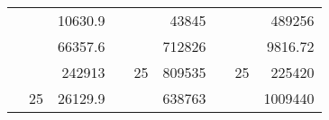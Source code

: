 \begin{table}[H]
\begin{tabular}{|ccrccrccc}
\rowcolor[HTML]{DAE8FC} 
\multicolumn{1}{|c|}{\cellcolor[HTML]{FFFFC7}}                                & \multicolumn{1}{c|}{\cellcolor[HTML]{DAE8FC}}                      & \multicolumn{1}{r|}{\cellcolor[HTML]{DAE8FC}10630.9}   & \multicolumn{1}{c|}{\cellcolor[HTML]{FFFFC7}}                                & \multicolumn{1}{c|}{\cellcolor[HTML]{DAE8FC}}                       & \multicolumn{1}{r|}{\cellcolor[HTML]{DAE8FC}43845}     & \multicolumn{1}{c|}{\cellcolor[HTML]{FFFFC7}}                                & \multicolumn{1}{c|}{\cellcolor[HTML]{DAE8FC}}                      & \multicolumn{1}{r|}{\cellcolor[HTML]{DAE8FC}489256}    \\ \cline{3-3} \cline{6-6} \cline{9-9} 
\multicolumn{1}{|c|}{\cellcolor[HTML]{FFFFC7}}                                & \multicolumn{1}{c|}{\cellcolor[HTML]{DAE8FC}}                      & \multicolumn{1}{r|}{\cellcolor[HTML]{DDFDFF}66357.6}   & \multicolumn{1}{c|}{\cellcolor[HTML]{FFFFC7}}                                & \multicolumn{1}{c|}{\cellcolor[HTML]{DAE8FC}}                       & \multicolumn{1}{r|}{\cellcolor[HTML]{DDFDFF}712826}    & \multicolumn{1}{c|}{\cellcolor[HTML]{FFFFC7}}                                & \multicolumn{1}{c|}{\cellcolor[HTML]{DAE8FC}}                      & \multicolumn{1}{r|}{\cellcolor[HTML]{DDFDFF}9816.72}   \\ \cline{3-3} \cline{6-6} \cline{9-9} 
\rowcolor[HTML]{DAE8FC} 
\multicolumn{1}{|c|}{\cellcolor[HTML]{FFFFC7}}                                & \multicolumn{1}{c|}{\cellcolor[HTML]{DAE8FC}}                      & \multicolumn{1}{r|}{\cellcolor[HTML]{DAE8FC}242913}    & \multicolumn{1}{c|}{\cellcolor[HTML]{FFFFC7}}                                & \multicolumn{1}{c|}{\multirow{-9}{*}{\cellcolor[HTML]{DAE8FC}25}}   & \multicolumn{1}{r|}{\cellcolor[HTML]{DAE8FC}809535}    & \multicolumn{1}{c|}{\cellcolor[HTML]{FFFFC7}}                                & \multicolumn{1}{c|}{\multirow{-9}{*}{\cellcolor[HTML]{DAE8FC}25}}  & \multicolumn{1}{r|}{\cellcolor[HTML]{DAE8FC}225420}    \\ \cline{3-3} \cline{5-6} \cline{8-9} 
\multicolumn{1}{|c|}{\cellcolor[HTML]{FFFFC7}}                                & \multicolumn{1}{c|}{\multirow{-10}{*}{\cellcolor[HTML]{DAE8FC}25}} & \multicolumn{1}{r|}{\cellcolor[HTML]{DDFDFF}26129.9}   & \multicolumn{1}{c|}{\cellcolor[HTML]{FFFFC7}}                                & \multicolumn{1}{c|}{\cellcolor[HTML]{DDFDFF}}                       & \multicolumn{1}{r|}{\cellcolor[HTML]{DAE8FC}638763}    & \multicolumn{1}{c|}{\cellcolor[HTML]{FFFFC7}}                                & \multicolumn{1}{c|}{\cellcolor[HTML]{DDFDFF}}                      & \multicolumn{1}{r|}{\cellcolor[HTML]{DAE8FC}1009440}   \\ \cline{2-3} \cline{6-6} \cline{9-9} 

\end{tabular}
\end{table}
